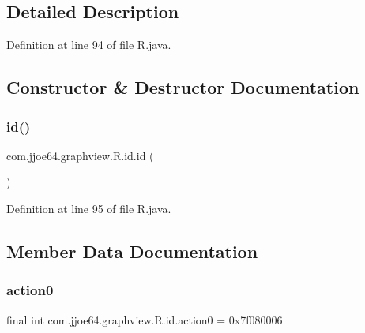 \subsection{Detailed Description}


Definition at line 94 of file R.\+java.



\subsection{Constructor \& Destructor Documentation}
\mbox{\label{classcom_1_1jjoe64_1_1graphview_1_1_r_1_1id_a8f17eca8851fc4a446a195c4c056beb2}} 
\subsubsection{\texorpdfstring{id()}{id()}}
{\footnotesize\ttfamily com.\+jjoe64.\+graphview.\+R.\+id.\+id (\begin{DoxyParamCaption}{ }\end{DoxyParamCaption})\hspace{0.3cm}{\ttfamily [private]}}



Definition at line 95 of file R.\+java.


\begin{DoxyCode}{0}

\end{DoxyCode}


\subsection{Member Data Documentation}
\mbox{\label{classcom_1_1jjoe64_1_1graphview_1_1_r_1_1id_a41d8edc56dd76bf1b12003742775af48}} 
\subsubsection{\texorpdfstring{action0}{action0}}
{\footnotesize\ttfamily final int com.\+jjoe64.\+graphview.\+R.\+id.\+action0 = 0x7f080006\hspace{0.3cm}{\ttfamily [static]}}



